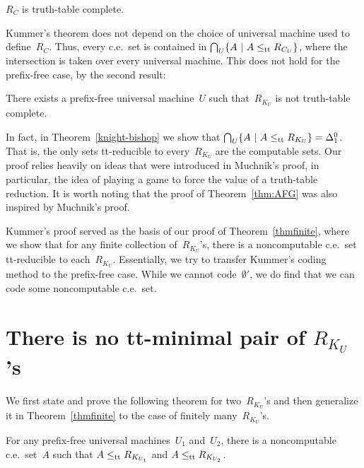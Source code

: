 \documentclass{LMCS}
\newcommand{\0}{\mathbf{0}}
\newcommand{\lett}{\leq_{\rm {tt}}}
\newcommand{\ce}{c.e.\ }
\newcommand{\<}{\langle}
\renewcommand{\>}{\rangle}
\begin{document}
\begin{thm}\label{KummerThm}
$R_C$ is truth-table complete.
\end{thm}


\noindent Kummer's theorem does not depend on the choice of universal machine
used to define~$R_C$.  Thus, every \ce set is contained in $\bigcap_U\{A \ |
\ A\lett R_{C_U}\}$, where the intersection is taken over every universal
machine.  This does not hold for the prefix-free case, by the second result:

\begin{thm}\label{MuchnikThm}
There exists a prefix-free universal machine~$U$ such that~$R_{K_U}$ is not
truth-table complete.
\end{thm}

\noindent In fact, in Theorem~\ref{knight-bishop} we show that $\bigcap_U\{A
\ | \ A\lett R_{K_U}\}=\Delta^0_1$.  That is, the only sets tt-reducible to
every~$R_{K_U}$ are the computable sets. Our proof relies heavily on ideas
that were introduced in Muchnik's proof, in particular, the idea of playing a
game to force the value of a truth-table reduction. It is worth noting that
the proof of Theorem~\ref{thm:AFG} was also inspired by Muchnik's proof.

Kummer's proof served as the basis of our proof of Theorem~\ref{thmfinite},
where we show that for any finite collection of~$R_{K_U}$'s, there is a
noncomputable \ce set tt-reducible to each~$R_{K_U}$. Essentially, we try to
transfer Kummer's coding method to the prefix-free case. While we cannot
code~$\emptyset'$, we do find that we can code some noncomputable \ce set.



\section{\texorpdfstring{There is no tt-minimal pair of $R_{K_U}$'s}{There is no tt-minimal pairs of U-random sets}}\label{sec_nominpair}

We first state and prove the following theorem for two~$R_{K_U}$'s and then
generalize it in Theorem~\ref{thmfinite} to the case of finitely
many~$R_{K_U}$'s.

\begin{thm}\label{theorem1}
For any prefix-free universal machines~$U_1$ and~$U_2$, there is a
noncomputable \ce set~$A$ such that $A\lett R_{K_{U_1}}$ and $A\lett
R_{K_{U_2}}$.
\end{thm}
\end{document}

